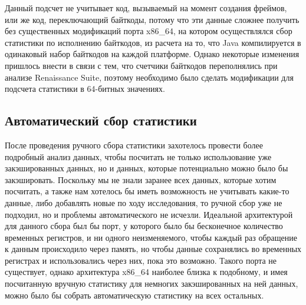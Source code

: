 Данный подсчет не учитывает код, вызываемый на момент создания фреймов, или же код, переключающий байткоды, потому что эти данные сложнее получить без существенных модификаций порта x86\_64, на котором осуществлялся сбор статистики по исполнению байткодов, из расчета на то, что Java компилируется в одинаковый набор байткодов на каждой платформе. Однако некоторые изменения пришлось внести в связи с тем, что счетчики байткодов переполнялись при анализе Renaissance Suite, поэтому необходимо было сделать модификации для подсчета статистики в 64-битных значениях.



\subsection{Автоматический сбор статистики}

После проведения ручного сбора статистики захотелось провести более подробный анализ данных, чтобы посчитать не только использование уже закэшированных данных, но и данных, которые потенциально можно было бы закэшировать. Поскольку мы не знали заранее всех данных, которые хотим посчитать, а также нам хотелось бы иметь возможность не учитывать какие-то данные, либо добавлять новые по ходу исследования, то ручной сбор уже не подходил, но и проблемы автоматического не исчезли. Идеальной архитектурой для данного сбора был бы порт, у которого было бы бесконечное количество временных регистров, и ни одного неизменяемого, чтобы каждый раз обращение к данным происходило через память, но чтобы данные сохранялись во временных регистрах и использовались через них, пока это возможно. Такого порта не существует, однако архитектура x86\_64 наиболее близка к подобному, и имея посчитанную вручную статистику для немногих закэшированных на ней данных, можно было бы собрать автоматическую статистику на всех остальных. 

